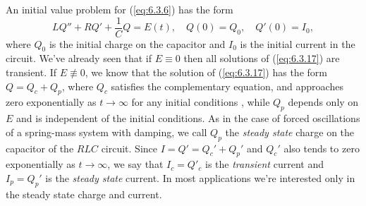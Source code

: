 \documentclass{ximera}
\begin{document}
An initial value problem for (\ref{eq:6.3.6})  has the form
\begin{equation} \label{eq:6.3.17}
 LQ''+RQ'+\frac{1}{C}Q=E(t),\quad Q(0)=Q_0,\quad Q'(0)=I_0,
\end{equation}
where $Q_0$ is the initial charge on the capacitor and $I_0$ is the
initial current in the circuit. We've already seen that if $E\equiv0$
then all solutions of (\ref{eq:6.3.17}) are transient. If
$E\not\equiv0$, we know that the solution of (\ref{eq:6.3.17}) has
the form $Q=Q_c+Q_p$, where $Q_c$ satisfies the complementary
equation, and approaches zero exponentially as $t\rightarrow\infty$ for any
initial conditions , while $Q_p$ depends only on $E$ and is
independent of the initial conditions. As in the case of forced
oscillations of a spring-mass system with damping, we call $Q_p$ the \textit{steady state} charge on the capacitor of the $RLC$ circuit. Since
$I=Q'=Q_c'+Q_p'$ and $Q_c'$ also tends to zero exponentially as
$t\rightarrow\infty$, we say that $I_c=Q'_c$ is the \textit{transient} current
and $I_p=Q_p'$ is the \textit{steady state} current. In most
applications we're interested only in the steady state charge and
current.
\end{document}
